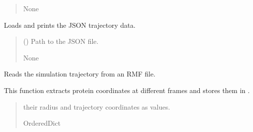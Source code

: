 \documentclass[letterpaper,10pt,english]{sphinxmanual}
\begin{document}
\begin{fulllineitems}
\begin{fulllineitems}
\begin{quote}
\begin{description}
\begin{itemize}
\end{itemize}

\sphinxAtStartPar
None

\end{description}\end{quote}

\end{fulllineitems}


\begin{fulllineitems}
\label{\detokenize{src:src.Analysis_Class.Analysis.print_json}}
\pysigstartsignatures
{}
\pysigstopsignatures
\sphinxAtStartPar
Loads and prints the JSON trajectory data.
\begin{quote}\begin{description}
\sphinxAtStartPar
{} () \textendash{} Path to the JSON file.

\sphinxAtStartPar
None

\end{description}\end{quote}

\end{fulllineitems}


\begin{fulllineitems}
\label{\detokenize{src:src.Analysis_Class.Analysis.read_trajectory}}
\pysigstartsignatures
{}
\pysigstopsignatures
\sphinxAtStartPar
Reads the simulation trajectory from an RMF file.

\sphinxAtStartPar
This function extracts protein coordinates at different frames and stores them in .
\begin{quote}\begin{description}
\sphinxAtStartPar
\begin{description}
\sphinxAtStartPar
their radius and trajectory coordinates as values.

\end{description}


\sphinxAtStartPar
OrderedDict

\end{description}\end{quote}

\end{fulllineitems}


\end{fulllineitems}
\end{document}
